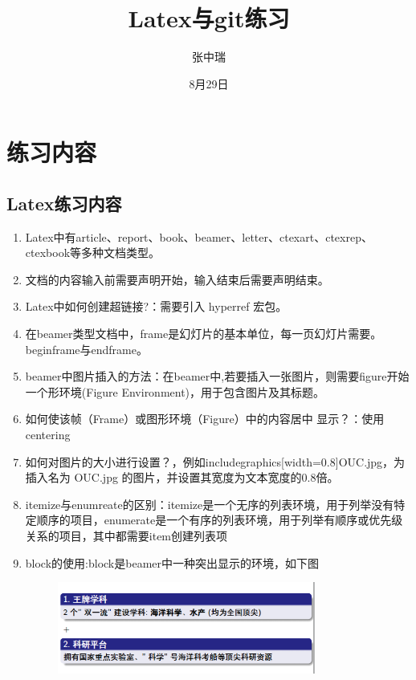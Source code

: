 \documentclass[10.5pt]{ctexart}
\title{Latex与git练习}
\author{张中瑞}
\date{8月29日}
\begin{document}
\maketitle

\section{练习内容}
\subsection{Latex练习内容}
\begin{enumerate}
    \item Latex中有article、report、book、beamer、letter、ctexart、ctexrep、ctexbook等多种文档类型。
    \item 文档的内容输入前需要声明开始，输入结束后需要声明结束。
    \item Latex中如何创建超链接?：需要引入 hyperref 宏包。
    \item 在beamer类型文档中，frame是幻灯片的基本单位，每一页幻灯片需要。begin{frame}与end{frame}。
    \item beamer中图片插入的方法：在beamer中,若要插入一张图片，则需要figure开始一个形环境(Figure Environment)，用于包含图片及其标题。
    \item 如何使该帧（Frame）或图形环境（Figure）中的内容居中
显示？：使用centering
    \item 如何对图片的大小进行设置？，例如includegraphics[width=0.8]{OUC.jpg}，为插入名为 OUC.jpg 的图片，并设置其宽度为文本宽度的0.8倍。
    \item itemize与enumreate的区别：itemize是一个无序的列表环境，用于列举没有特定顺序的项目，enumerate是一个有序的列表环境，用于列举有顺序或优先级关系的项目，其中都需要item创建列表项
    \item block的使用:block是beamer中一种突出显示的环境，如下图
    \begin{figure}
     \centering 
     \includegraphics[width=0.8\textwidth]{1.png}
     \caption{}
     \end{figure}
\end{enumerate}
\end{document}
